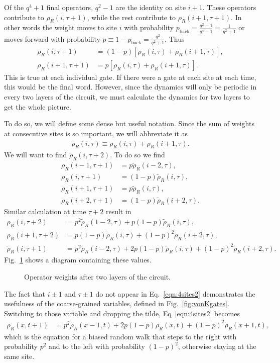 \documentclass[a4paper,11pt]{article}
\renewcommand{\th}[1]{\frac{1}{#1}}
\renewcommand{\t}{\tau}
\newcommand{\nn}{\nonumber\\}
\begin{document}
Of the $q^4+1$ final operators, $q^2-1$ are the identity on site $i+1$. These operators contribute to $\rho_R(i,\tau+1)$, while the rest contribute to $\rho_R(i+1, \tau+1)$. In other words the weight moves to site $i$ with probability $p_\text{back} = \frac{q^2-1}{q^4-1} = \th{q^2+1}$ or moves forward with probability $p\equiv 1- p_\text{back} = \frac{q^2}{q^2+1}$. Thus
\begin{align}
\rho_R(i,  \t+1) &= (1-p)\left[\rho_R(i,\t)+\rho_R(i+1,\t)\right],\nn
\rho_R(i+1,\t+1) &=    p \left[\rho_R(i,\t)+\rho_R(i+1,\t)\right].
\end{align}
This is true at each individual gate. If there were a gate at each site at each time, this would be the final word. However, since the dynamics will only be periodic in every two layers of the circuit, we must calculate the dynamics for two layers to get the whole picture.

To do so, we will define some dense but useful notation. Since the sum of weights at consecutive sites is so important, we will abbreviate it as
\begin{align}
\tilde{\rho}_R(i,\t) \equiv \rho_R(i,\tau) + \rho_R(i+1, \tau). \label{eqn:rhotil}
\end{align}
We will want to find $\tilde{\rho}_R(i,\t+2)$. To do so we find
\begin{align}
\rho_R(i-1, \t+1) &=    p  \tilde{\rho}_R(i-2, \t),\nn
\rho_R(i  , \t+1) &= (1-p) \tilde{\rho}_R(i  , \t),\nn
\rho_R(i+1, \t+1) &=    p  \tilde{\rho}_R(i  , \t),\nn
\rho_R(i+2, \t+1) &= (1-p) \tilde{\rho}_R(i+2, \t).\label{eqn:4sites1}
\end{align}
Similar calculation at time $\t+2$ result in
\begin{align}
\rho_R(i  , \t+2) &= p^2\tilde{\rho}_R(1-2,\t) + p(1-p)\tilde{\rho}_R(i,\t),\nn
\rho_R(i+1, \t+2) &= p(1-p)\tilde{\rho}_R(i,\t) + (1-p)^2\tilde{\rho}_R(i+2,
	\t), \nn
\tilde{\rho}_R(i,\t+1)&=p^2\tilde{\rho}_R(i-2,\t)+2p(1-p)\tilde{\rho}_R(i,\t)+
	(1-p)^2\tilde{\rho}_R(i+2,\t). \label{eqn:4sites2}
\end{align}
Fig.~\ref{fig:4sites} shows a diagram containing these values.
\begin{figure}
	\centering
	
	\caption{Operator weights after two layers of the circuit.}
	\label{fig:4sites}
\end{figure}

The fact that $i\pm1$ and $\t\pm1$ do not appear in Eq.~\ref{eqn:4sites2} demonstrates the usefulness of the coarse-grained variables, defined in Fig.~\ref{fig:vonKgates}. Switching to those variable and dropping the tilde, Eq~\ref{eqn:4sites2} becomes
\begin{align}
\rho_R(x,t+1)&=p^2\rho_R(x-1,t)+2p(1-p)\rho_R(x,t)+(1-p)^2\rho_R(x+1,t), 
	\label{eqn:4sites3}
\end{align}
which is the equation for a biased random walk that steps to the right with probability $p^2$ and to the left with probability $(1-p)^2$, otherwise staying at the same site. 
\end{document}
